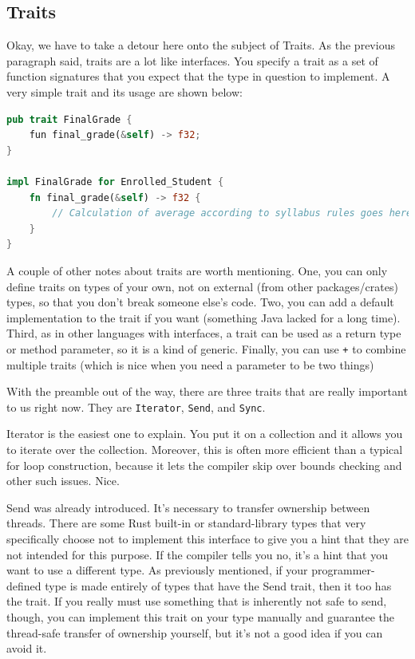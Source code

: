 \subsection*{Traits}
Okay, we have to take a detour here onto the subject of Traits. As the previous paragraph said, traits are a lot like interfaces. You specify a trait as a set of function signatures that you expect that the type in question to implement. A very simple trait and its usage are shown below:

\begin{lstlisting}[language=Rust]
pub trait FinalGrade {
	fun final_grade(&self) -> f32;
}

impl FinalGrade for Enrolled_Student {
    fn final_grade(&self) -> f32 {
        // Calculation of average according to syllabus rules goes here
    }	
}  
\end{lstlisting}

A couple of other notes about traits are worth mentioning. One, you can only define traits on types of your own, not on external (from other packages/crates) types, so that you don't break someone else's code. Two, you can add a default implementation to the trait if you want (something Java lacked for a long time). Third, as in other languages with interfaces, a trait can be used as a return type or method parameter, so it is a kind of generic. Finally, you can use \texttt{+} to combine multiple traits (which is nice when you need a parameter to be two things)

With the preamble out of the way, there are three traits that are really important to us right now. They are \texttt{Iterator}, \texttt{Send}, and \texttt{Sync}. 

Iterator is the easiest one to explain. You put it on a collection and it allows you to iterate over the collection. Moreover, this is often more efficient than a typical for loop construction, because it lets the compiler skip over bounds checking and other such issues. Nice.

Send was already introduced. It's necessary to transfer ownership between threads. There are some Rust built-in or standard-library types that very specifically choose not to implement this interface to give you a hint that they are not intended for this purpose. If the compiler tells you no, it's a hint that you want to use a different type. As previously mentioned, if your programmer-defined type is made entirely of types that have the Send trait, then it too has the trait. If you really must use something that is inherently not safe to send, though, you can implement this trait on your type manually and guarantee the thread-safe transfer of ownership yourself, but it's not a good idea if you can avoid it.

